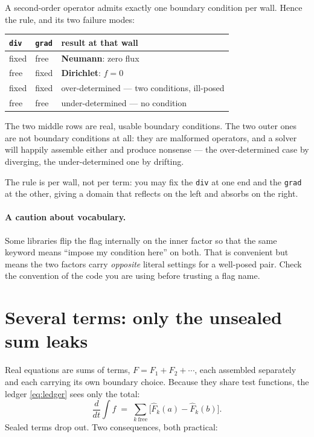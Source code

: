 \documentclass[11pt]{article}
\newcommand{\code}[1]{\texttt{#1}}
\begin{document}
A second-order operator admits exactly one boundary condition per wall. Hence
the rule, and its two failure modes:

\begin{center}
\begin{tabular}{@{}lll@{}}
\toprule
\code{div} & \code{grad} & result at that wall \\
\midrule
fixed & free  & \textbf{Neumann}: zero flux \\
free  & fixed & \textbf{Dirichlet}: $f=0$ \\
fixed & fixed & over-determined --- two conditions, ill-posed \\
free  & free  & under-determined --- no condition \\
\bottomrule
\end{tabular}
\end{center}

The two middle rows are real, usable boundary conditions. The two outer ones are
not boundary conditions at all: they are malformed operators, and a solver will
happily assemble either and produce nonsense --- the over-determined case by
diverging, the under-determined one by drifting.

The rule is per wall, not per term: you may fix the \code{div} at one end and
the \code{grad} at the other, giving a domain that reflects on the left and
absorbs on the right.

\paragraph{A caution about vocabulary.} Some libraries flip the flag internally
on the inner factor so that the same keyword means ``impose my condition here''
on both. That is convenient but means the two factors carry \emph{opposite}
literal settings for a well-posed pair. Check the convention of the code you
are using before trusting a flag name.

\section{Several terms: only the unsealed sum leaks}

Real equations are sums of terms, $F = F_1 + F_2 + \cdots$, each assembled
separately and each carrying its own boundary choice. Because they share test
functions, the ledger \eqref{eq:ledger} sees only the total:
\begin{equation}
  \frac{d}{dt}\int f \;=\; \sum_{k\ \text{free}} \big[\widehat F_k(a) - \widehat F_k(b)\big] .
\end{equation}
Sealed terms drop out. Two consequences, both practical:
\end{document}
